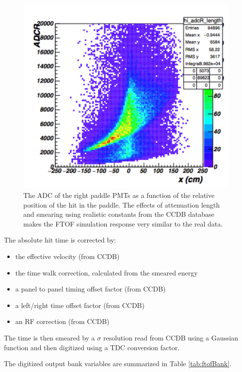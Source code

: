 \begin{figure}
	\centering
	\includegraphics[width=0.99\columnwidth,keepaspectratio]{img/ftofAtten.png}
	\caption{The ADC of the right paddle PMTs as a function of the relative position of the hit in the paddle. The effects of attenuation
				length and smearing using realistic constants from the CCDB database makes the FTOF simulation response very similar to the real data.}
	\label{fig:ftofAtten}
\end{figure}



The absolute hit time is corrected by:

\begin{itemize}
	\item the effective velocity (from CCDB)
	\item the time walk correction, calculated from the smeared energy
	\item a panel to panel timing offset factor (from CCDB)
	\item a left/right time offset factor (from CCDB)
	\item an RF correction (from CCDB)
\end{itemize}

The time is then smeared by a $\sigma$ resolution read from CCDB using a Gaussian function and then digitized using a TDC conversion factor.


The digitized output bank variables are summarized in Table \ref{tab:ftofBank}.

